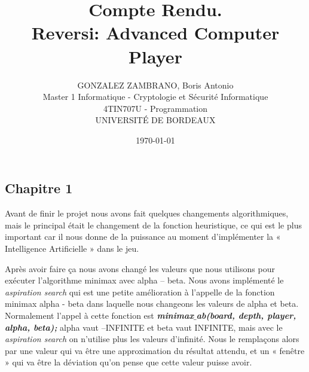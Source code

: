 \documentclass[a4paper,12pt]{article}
\begin{document}
\title{
\vspace{\baselineskip}
\vspace{\baselineskip}
\vspace{\baselineskip}
\vspace{\baselineskip}
\vspace{\baselineskip}
Compte Rendu.\\ Reversi: Advanced Computer Player}
\author{GONZALEZ ZAMBRANO, Boris Antonio\\
\small{Master 1 Informatique - Cryptologie et Sécurité Informatique}\\
\small{4TIN707U - Programmation}\\
\small{UNIVERSITÉ DE BORDEAUX}}
\date{\small{\today}}

\maketitle

\newpage

\tableofcontents

\newpage

\vspace{\baselineskip}
\noindent \begin{Center}

\section{Chapitre 1}
\end{Center}\par


\vspace{\baselineskip}

\noindent \begin{justify}
Avant de finir le projet nous avons fait quelques changements algorithmiques, mais le principal était le changement de la fonction heuristique, ce qui est le plus important car il nous donne de la puissance au moment d’implémenter la « Intelligence Artificielle » dans le jeu.
\end{justify}\par


\vspace{\baselineskip}

\noindent \begin{justify}
Après avoir faire ça nous avons changé les valeurs que nous utilisons pour exécuter l’algorithme minimax avec alpha – beta. Nous avons implémenté le \textit{aspiration search }qui est une petite amélioration à l’appelle de la fonction minimax alpha - beta\textit{ }dans laquelle nous changeons les valeurs de alpha et beta. Normalement l’appel à cette fonction est \textbf{\textit{minimax$ \_ $ab(board, depth, player, alpha, beta); }}alpha vaut –INFINITE et beta vaut INFINITE, mais avec le \textit{aspiration search }on n’utilise plus les valeurs d’infinité. Nous le remplaçons alors par une valeur qui va être une approximation du résultat attendu, et un « fenêtre » qui va être la déviation qu’on pense que cette valeur puisse avoir. 
\end{justify}\par
\end{document}
